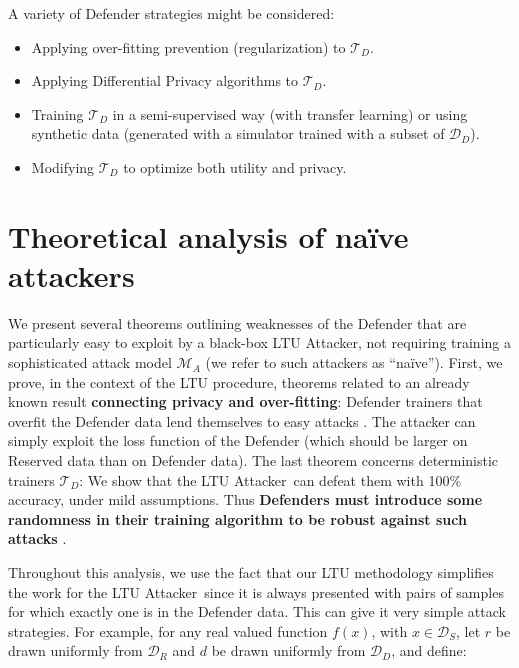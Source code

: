 \documentclass[letterpaper]{article}
\newcommand{\oracle}{LTU Attacker~}
\begin{document}
A variety of Defender strategies might be considered:
\begin{itemize}
    \item Applying over-fitting prevention (regularization) to $\mathcal{T}_D$.
    \item Applying Differential Privacy algorithms to $\mathcal{T}_D$.
    \item Training $\mathcal{T}_D$ in a semi-supervised way (with transfer learning) or using synthetic data (generated with a simulator trained with a subset of $\mathcal{D}_D$).
    \item Modifying $\mathcal{T}_D$ to optimize both utility and privacy.
\end{itemize}


\section{Theoretical analysis of na\"ive attackers}
We present several theorems outlining weaknesses of the Defender that are particularly easy to exploit by a black-box LTU Attacker, not requiring training a sophisticated attack model $\mathcal{M}_A$ (we refer to such attackers as ``na\"ive''). %
First, we prove, in the context of the LTU procedure, theorems related to an already known result {\bf connecting privacy and over-fitting}: Defender trainers that overfit the Defender data lend themselves to easy attacks  \cite{yeom2018privacy}. The attacker can simply exploit the loss function of the Defender (which should be larger on Reserved data than on Defender data).
The last theorem concerns deterministic trainers  $\mathcal{T}_D$: We show that the \oracle can defeat them with 100\% accuracy, under mild assumptions. Thus {\bf Defenders must introduce some randomness in their training algorithm to be robust against such attacks} \cite{Dwork2017}.

Throughout this analysis, we use the fact that our LTU methodology simplifies the work for the \oracle since it is always presented with pairs of samples for which exactly one is in the Defender data. This can give it very simple attack strategies.
For example, for any real valued function $f(x)$, with $x \in \mathcal{D}_S$, let $r$ be drawn uniformly from $\mathcal{D}_R$ and $d$ be drawn uniformly from $\mathcal{D}_D$, and define:
\end{document}
